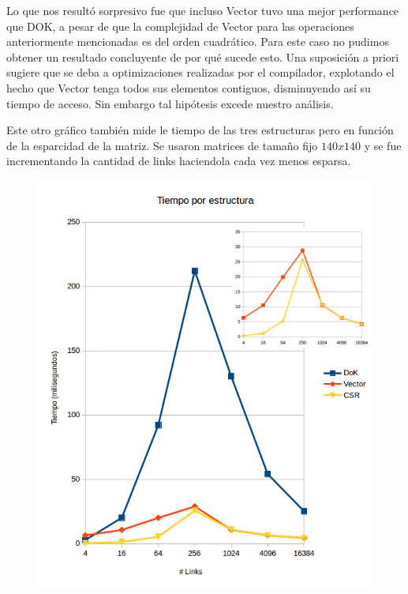 Lo que nos resultó sorpresivo fue que incluso Vector tuvo una mejor performance que DOK, a pesar de que la complejidad de Vector para las operaciones anteriormente mencionadas es del orden cuadrático. Para este caso no pudimos obtener un resultado concluyente de por qué sucede esto. Una suposición a priori sugiere que se deba a optimizaciones realizadas por el compilador, explotando el hecho que Vector tenga todos sus elementos contiguos, disminuyendo así su tiempo de acceso. Sin embargo tal hipótesis excede nuestro análisis.\\
\newpage

Este otro gráfico también mide le tiempo de las tres estructuras pero en función de la esparcidad de la matriz. Se usaron matrices de tamaño fijo $140x140$ y se fue incrementando la cantidad de links haciendola cada vez menos esparsa.\\

\begin{figure}
  \vspace{-20pt}
  \begin{center}
    \includegraphics[scale=0.4]{imagenes/MedicionTiempoEstructura.png}
  \end{center}
  \vspace{-20pt}
  \vspace{-10pt}
  \label{fig:img1}
\end{figure}

